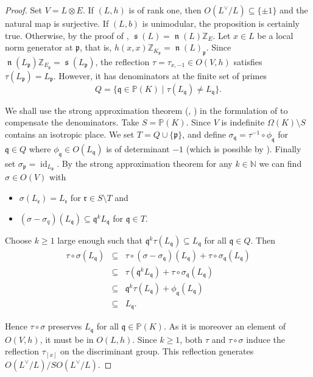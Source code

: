 \documentclass{amsart}
\theoremstyle{definition}
\theoremstyle{plain}
\DeclareMathOperator{\id}{id}
\DeclareMathOperator{\scale}{\mathfrak{s}}
\DeclareMathOperator{\norm}{\mathfrak{n}}
\newcommand{\ZZ}{\mathbb{Z}}
\newcommand{\NN}{\mathbb{N}}
\newcommand{\disc}[1]{#1^{\vee} \! / #1 }
\begin{document}
\begin{proof}
 Set $V = L\otimes E$.
 If $(L,h)$ is of rank one, then $O(L^\vee/L)\subseteq\{\pm 1\}$ and the natural map is surjective.
 If $(L,b)$ is unimodular, the proposition is certainly true.
 Otherwise, by the proof of , $\scale(L) = \norm(L)\ZZ_{E}$. Let $x \in L$ be a local norm generator at $\mathfrak{p}$, that is, $h(x,x)\ZZ_{K_\mathfrak{p}} = \norm(L)_\mathfrak{p}$.
 Since $\norm(L_\mathfrak{p})\ZZ_{E_\mathfrak{p}}=\scale(L_\mathfrak{p})$, the reflection $\tau=\tau_{x,-1} \in O(V,h)$ satisfies $\tau(L_\mathfrak{p}) = L_\mathfrak{p}$.
 However, it has denominators at the finite set of primes
 \[Q = \{\mathfrak{q} \in \mathbb{P}(K) \mid \tau(L_\mathfrak{q}) \neq L_\mathfrak{q}\}.\]
 
 We shall use the strong approximation theorem (\cite[5.12]{shimura:unitary}, \cite{kneser:strong-approx}) in the formulation of \cite[Thm.\ 5.1.3]{kirschmer:hermitian} to compensate the denominators.
 Take $S = \mathbb{P}(K)$. Since $V$ is indefinite $\Omega(K) \setminus S$ contains an isotropic place. We set $T = Q \cup \{ \mathfrak{p}\}$, and define
 $\sigma_\mathfrak{q} = \tau^{-1} \circ \phi_\mathfrak{q} $ for $\mathfrak{q} \in Q$ where $\phi_\mathfrak{q}\in O(L_\mathfrak{q})$ is of determinant $-1$ (which is possible by \cite[Cor.\ 3.6]{kirschmer:determinants}). Finally set $\sigma_\mathfrak{p} = \id_{L_\mathfrak{p}}$.
 By the strong approximation theorem for any $k \in \NN$ we can find $\sigma \in O(V)$ with
 \begin{itemize}
  \item  $\sigma(L_\mathfrak{r}) = L_\mathfrak{r}$ for $\mathfrak{r} \in S \setminus T$ and
  \item  $(\sigma - \sigma_{q})(L_\mathfrak{q})\subseteq \mathfrak{q}^kL_{\mathfrak{q}}$ for $\mathfrak{q} \in T$.
 \end{itemize}
 
 Choose $k\geq 1$ large enough such that $\mathfrak{q}^k \tau( L_\mathfrak{q}) \subseteq L_{\mathfrak{q}}$ for all $\mathfrak{q} \in Q$.
 Then
 \begin{eqnarray*}
  \tau \circ \sigma (L_\mathfrak{q})
  &\subseteq& \tau \circ \left(\sigma - \sigma_\mathfrak{q}\right)(L_\mathfrak{q}) + \tau \circ \sigma_\mathfrak{q}(L_\mathfrak{q})\\
  &\subseteq& \tau(\mathfrak{q}^k L_\mathfrak{q}) + \tau\circ \sigma_\mathfrak{q}(L_\mathfrak{q})\\
  &\subseteq& \mathfrak{q}^k \tau(L_\mathfrak{q}) + \phi_\mathfrak{q}(L_\mathfrak{q})\\
  &\subseteq& L_\mathfrak{q}.
 \end{eqnarray*}

 Hence $\tau \circ \sigma$ preserves $L_\mathfrak{q}$ for all $\mathfrak{q} \in \mathbb{P}(K)$. As it is moreover an element of $O(V,h)$, it must be in $O(L,h)$.
 Since $k\geq 1$, both $\tau$ and $\tau \circ \sigma$ induce the reflection $\tau_{[x]}$ on the discriminant group. This reflection generates $O(\disc{L})/SO(\disc{L})$.
\end{proof}
\end{document}
